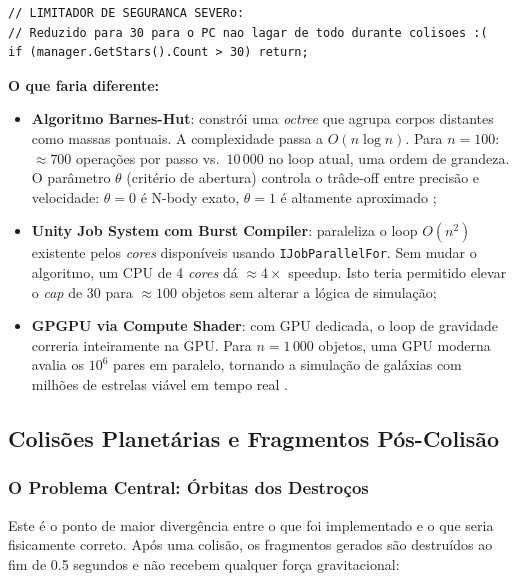 \documentclass[12pt,a4paper]{article}
\begin{document}
\begin{lstlisting}[caption={PlanetCollision.cs - cap de seguran\c{c}a por aus\^{e}ncia de poder computacional}]
// LIMITADOR DE SEGURANCA SEVERo:
// Reduzido para 30 para o PC nao lagar de todo durante colisoes :(
if (manager.GetStars().Count > 30) return;
\end{lstlisting}

\textbf{O que faria diferente:}

\begin{itemize}
  \item \textbf{Algoritmo Barnes-Hut}: constr\'{o}i uma \textit{octree} que agrupa corpos distantes como massas pontuais. A complexidade passa a $O(n \log n)$. Para $n = 100$: $\approx 700$ opera\c{c}\~{o}es por passo vs.\ $10\,000$ no loop atual, uma ordem de grandeza. O par\^{a}metro $\theta$ (crit\'{e}rio de abertura) controla o tr\^{a}de-off entre precis\~{a}o e velocidade: $\theta = 0$ \'{e} N-body exato, $\theta = 1$ \'{e} altamente aproximado \cite{barnes1986};
  
  \item \textbf{Unity Job System com Burst Compiler}: paraleliza o loop $O(n^2)$ existente pelos \textit{cores} dispon\'{i}veis usando \texttt{IJobParallelFor}. Sem mudar o algoritmo, um CPU de 4 \textit{cores} d\'{a} $\approx 4\times$ speedup. Isto teria permitido elevar o \textit{cap} de 30 para $\approx 100$ objetos sem alterar a l\'{o}gica de simula\c{c}\~{a}o;
  
  \item \textbf{GPGPU via Compute Shader}: com GPU dedicada, o loop de gravidade correria inteiramente na GPU. Para $n = 1\,000$ objetos, uma GPU moderna avalia os $10^6$ pares em paralelo, tornando a simula\c{c}\~{a}o de gal\'{a}xias com milh\~{o}es de estrelas vi\'{a}vel em tempo real \cite{nyland2007,springel2005}.
\end{itemize}

\subsection{Colis\~{o}es Planet\'{a}rias e Fragmentos P\'{o}s-Colis\~{a}o}

\subsubsection{O Problema Central: \'{O}rbitas dos Destro\c{c}os}

Este \'{e} o ponto de maior diverg\^{e}ncia entre o que foi implementado e o que seria fisicamente correto. Ap\'{o}s uma colis\~{a}o, os fragmentos gerados s\~{a}o destru\'{i}dos ao fim de 0.5 segundos e n\~{a}o recebem qualquer for\c{c}a gravitacional:
\end{document}
